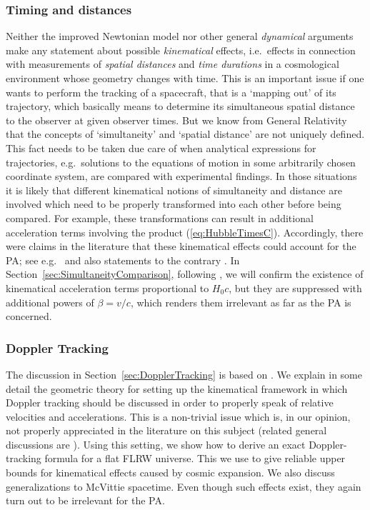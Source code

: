 \documentclass
[rmp,aps,twocolumn,showpacs,preprintnumbers,amsmath,amssymb]{revtex4}
\theoremstyle{plain}
\theoremstyle{definition}
\theoremstyle{remark}
\begin{document}
\subsubsection{Timing and distances}
\label{sec:TimingAndDistances}
%
Neither the improved Newtonian model nor other general \emph{dynamical} 
arguments make any statement about possible \emph{kinematical} 
effects, i.e.~effects in connection with measurements of 
\emph{spatial distances} and \emph{time durations} in a cosmological 
environment whose geometry changes with time. This is an important 
issue if one wants to perform the tracking of a spacecraft, that is 
a `mapping out' of its trajectory, which basically means to determine 
its simultaneous spatial distance to the observer at given observer times. 
But we know from General Relativity that the concepts of `simultaneity' 
and `spatial distance' are not uniquely defined. This fact needs to be 
taken due care of when analytical expressions for trajectories, 
e.g.~solutions to the equations of motion in some arbitrarily chosen 
coordinate system, are compared with experimental findings. In those 
situations it is likely that different kinematical notions of simultaneity 
and distance are involved which need to be properly transformed into each 
other before being compared. For example, these transformations can 
result in additional acceleration terms involving the product 
(\ref{eq:HubbleTimesC}). Accordingly, there were claims in the 
literature that these kinematical effects could account for the PA; 
see e.g.~\cite{Palle:2005,Nottale:2003,Rosales:2002,%
Rosales.Sanchez-Gomez:1998,Ranada:2005,Nieto.etal:2005} and also 
statements to the contrary \cite{Laemmerzahl.etal:2006}. 
In Section~\ref{sec:SimultaneityComparison}, following 
\cite{Carrera.Giulini:2005}, we will confirm the existence of kinematical 
acceleration terms proportional to $H_0c$, but they are suppressed with 
additional powers of $\beta=v/c$, which renders them irrelevant as far as 
the PA is concerned. 


\subsubsection{Doppler Tracking}
\label{sec:DopplerTrackingIntro}
%
The discussion in Section~\ref{sec:DopplerTracking} is based on 
\cite{Carrera.Giulini:2006b}. We explain in some detail the geometric 
theory for setting up the kinematical framework in which Doppler 
tracking should be discussed in order to properly speak of relative 
velocities and accelerations. This is a non-trivial issue which is, 
in our opinion, not properly appreciated in the literature on this 
subject (related general discussions are \cite{Bini.etal:1995,Bolos:2007}). 
Using this setting, we show how to derive an exact Doppler-tracking 
formula for a flat FLRW universe. This we use to give reliable 
upper bounds for kinematical effects caused by cosmic expansion. 
We also discuss generalizations to McVittie spacetime. Even though 
such effects exist, they again turn out to be irrelevant for the PA. 
\end{document}
